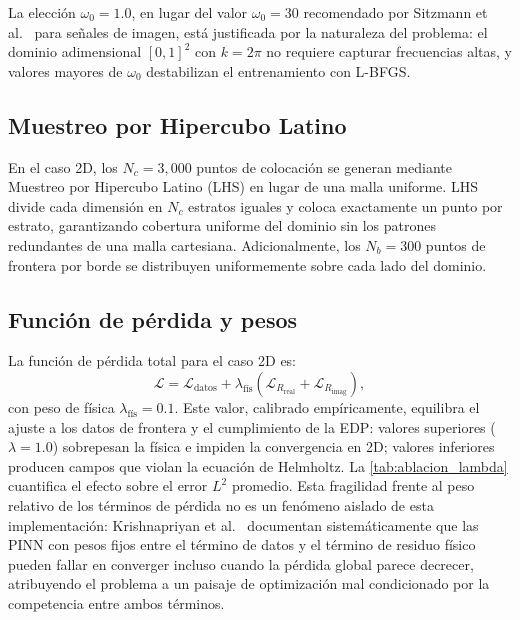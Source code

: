 La elección $\omega_0 = 1.0$, en lugar del valor $\omega_0 = 30$ recomendado por
Sitzmann et al.~\cite{Sitzmann2020_SIREN} para señales de imagen, está justificada por la naturaleza
del problema: el dominio adimensional $[0,1]^2$ con $k = 2\pi$ no requiere capturar
frecuencias altas, y valores mayores de $\omega_0$ destabilizan el entrenamiento con
L-BFGS.

\subsection{Muestreo por Hipercubo Latino}
\label{subsec:lhs}

En el caso 2D, los $N_c = 3{,}000$ puntos de colocación se generan mediante
Muestreo por Hipercubo Latino (LHS) \cite{Mckay1979_LHS} en lugar de una malla
uniforme.
LHS divide cada dimensión en $N_c$ estratos iguales y coloca exactamente un punto
por estrato, garantizando cobertura uniforme del dominio sin los patrones redundantes
de una malla cartesiana.
Adicionalmente, los $N_b = 300$ puntos de frontera por borde se distribuyen
uniformemente sobre cada lado del dominio.

\subsection{Función de pérdida y pesos}
\label{subsec:loss}

La función de pérdida total para el caso 2D es:
%
\begin{equation}
  \mathcal{L} = \mathcal{L}_{\mathrm{datos}}
              + \lambda_{\mathrm{fís}}\!\left(
                  \mathcal{L}_{R_{\mathrm{real}}} + \mathcal{L}_{R_{\mathrm{imag}}}
                \right),
  \label{eq:loss_2d}
\end{equation}
%
con peso de física $\lambda_{\mathrm{fís}} = 0.1$.
Este valor, calibrado empíricamente, equilibra el ajuste a los datos de frontera y
el cumplimiento de la EDP: valores superiores ($\lambda = 1.0$) sobrepesan la física
e impiden la convergencia en 2D; valores inferiores producen campos que violan la
ecuación de Helmholtz.
La \cref{tab:ablacion_lambda} cuantifica el efecto sobre el error $L^2$ promedio.
Esta fragilidad frente al peso relativo de los términos de pérdida no es un fenómeno
aislado de esta implementación: Krishnapriyan et al.~\cite{Krishnapriyan2021_failureModes}
documentan sistemáticamente que las PINN con pesos fijos entre el término de datos y el
término de residuo físico pueden fallar en converger incluso cuando la pérdida global
parece decrecer, atribuyendo el problema a un paisaje de optimización mal condicionado
por la competencia entre ambos términos.

